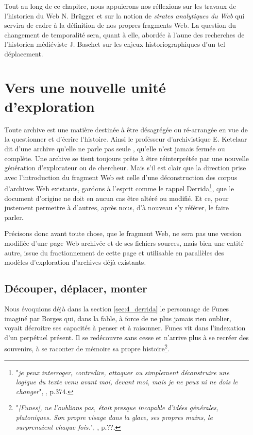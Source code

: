 \documentclass[symmetric,justified,marginals=raggedouter]{tufte-book}
\begin{document}
Tout au long de ce chapitre, nous appuierons nos réflexions sur les travaux de l'historien du Web N. Brügger et sur la notion de \textit{strates analytiques du Web} qui servira de cadre à la définition de nos propres fragments Web. La question du changement de temporalité sera, quant à elle, abordée à l'aune des recherches de l'historien médiéviste J. Baschet sur les enjeux historiographiques d'un tel déplacement.  

\section{Vers une nouvelle unité d'exploration}

\par\noindent Toute archive est une matière destinée à être désagrégée ou ré-arrangée en vue de la questionner et d'écrire l'histoire. Ainsi le profésseur d'archivistique E. Ketelaar dit d'une archive qu'elle ne parle pas seule \citep{ketelaar_de_2006}, qu'elle n'est jamais fermée ou complète. Une archive se tient toujours prête à être réinterprétée par une nouvelle génération d'explorateur ou de chercheur. Mais s'il est clair que la direction prise avec l'introduction du fragment Web est celle d'une déconstruction des corpus d'archives Web existants, gardons à l'esprit comme le rappel Derrida\footnote{"\textit{je peux interroger, contredire, attaquer ou simplement déconstruire une logique du texte venu avant moi, devant moi, mais je ne peux ni ne dois le changer}", \citep{derrida_mal_1995}, p.374.}, que le document d'origine ne doit en aucun cas être altéré ou modifié. Et ce, pour justement permettre à d'autres, après nous, d'à nouveau s'y référer, le faire parler. 

Précisons donc avant toute chose, que le fragment Web, ne sera pas une version modifiée d'une page Web archivée et de ses fichiers sources, mais bien une entité autre, issue du fractionnement de cette page et utilisable en parallèles des modèles d'exploration d'archives déjà existants.    

\subsection{Découper, déplacer, monter}

\par\noindent Nous évoquions déjà dans la section \ref{sec:4_derrida} le personnage de Funes imaginé par Borges qui, dans la fable, à force de ne plus jamais rien oublier, voyait décroitre ses capacités à penser et à raisonner. Funes vit dans l'indexation d'un perpétuel présent. Il se redécouvre sans cesse et n'arrive plus à se recréer des souvenirs, à se raconter de mémoire sa propre histoire\footnote{"\textit{[Funes], ne l’oublions pas, était presque incapable d’idées générales, platoniques. Son propre visage dans la glace, ses propres mains, le surprenaient chaque fois.}", \citep{borges_fictions_1974}, p.??.}. 
\end{document}
